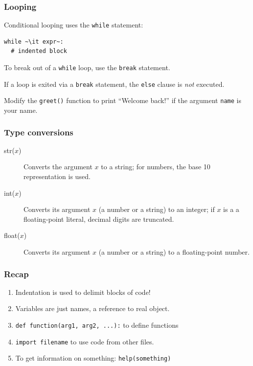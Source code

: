 \documentclass[english,serif,mathserif,xcolor=pdftex,dvipsnames,table]{beamer}
\begin{document}
\begin{frame}[fragile]
  \frametitle{Looping}
  Conditional looping uses the \texttt{while} statement:
\begin{lstlisting}
while ~\it expr~:
  # indented block
\end{lstlisting}

  \+
  To break out of a \texttt{while} loop, use the \texttt{break}
  statement.

  \+
  If a loop is exited via a \texttt{break} statement, the
  \texttt{else} clause is \emph{not} executed.

\end{frame}


\begin{frame}
  \begin{exercise}
    Modify the \texttt{greet()} function to print ``Welcome back!'' if
    the argument \texttt{name} is your name.
  \end{exercise}
\end{frame}


\begin{frame}[fragile,label=typeconv]
  \frametitle{Type conversions}
  \begin{description}
  \item[str($x$)] Converts the argument $x$ to a string; for numbers,
    the base 10 representation is used.
  \item[int($x$)] Converts its argument $x$ (a number or a string) to an integer;
    if $x$ is a a floating-point literal, decimal digits are truncated.
  \item[float($x$)] Converts its argument $x$ (a number or a string) to a
    floating-point number.
  \end{description}

  \hyperlink{func1}{}
\end{frame}


\begin{frame}
  \frametitle{Recap}
  \begin{enumerate}
  \item Indentation is used to delimit blocks of code!
  \item Variables are just names, a reference to real object.
  \item \lstinline|def function(arg1, arg2, ...):| to define functions
  \item \lstinline|import filename| to use code from other files.
  \item To get information on something: \lstinline|help(something)|
  \end{enumerate}
\end{frame}
\end{document}
